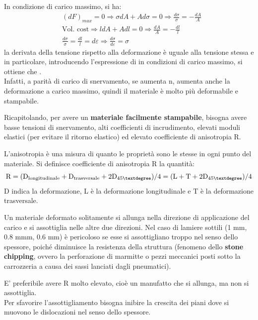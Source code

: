 In condizione di carico massimo, si ha:
\begin{align*}
    & (dF)_{max} = 0 \Rightarrow \sigma dA + A d\sigma = 0 \Rightarrow \frac{d\sigma}{\sigma} = -\frac{dA}{A}\\
    & \text{Vol. cost} \Rightarrow ldA + Adl = 0 \Rightarrow \frac{dA}{A} = -\frac{dl}{l}\\
    & \frac{d\sigma}{\sigma} = \frac{dl}{l} = d\varepsilon \Rightarrow \boxed{\frac{d\sigma}{d\varepsilon} = \sigma}
\end{align*}
 la derivata della tensione rispetto alla deformazione è uguale alla tensione stessa e in particolare, introducendo l’espressione di  in condizioni di carico massimo, si ottiene che .\\
Infatti, a parità di carico di snervamento, se aumenta n, aumenta anche la deformazione a carico massimo, quindi il materiale è molto più deformabile e stampabile.

Ricapitolando, per avere un \textbf{materiale facilmente stampabile}, bisogna avere basse tensioni di snervamento, alti coefficienti di incrudimento, elevati moduli elastici (per evitare il ritorno elastico) ed elevato coefficiente di anisotropia R.

L’anisotropia è una misura di quanto le proprietà sono le stesse in ogni punto del materiale.
Si definisce coefficiente di anisotropia R la quantità:
\begin{equation*}
    \mathtext{R = (D_{longitudinale} + D_{trasversale} + 2D_{45°}) / 4 = (L + T +2D_{45°}) / 4}
\end{equation*}
D indica la deformazione, L è la deformazione longitudinale e T è la deformazione trasversale.

Un materiale deformato solitamente si allunga nella direzione di applicazione del carico e si assottiglia nelle altre due direzioni. Nel caso di lamiere sottili (1 mm, 0.8 mmm, 0.6 mm) è pericoloso se esse si assottigliano troppo nel senso dello spessore, poiché diminuisce la resistenza della struttura (fenomeno dello \textbf{stone chipping}, ovvero la perforazione di marmitte o pezzi meccanici posti sotto la carrozzeria a causa dei sassi lanciati dagli pneumatici).

E’ preferibile avere R molto elevato, cioè un manufatto che si allunga, ma non si assottiglia.\\
Per sfavorire l’assottigliamento bisogna inibire la crescita dei piani dove si muovono le dislocazioni nel senso dello spessore.


